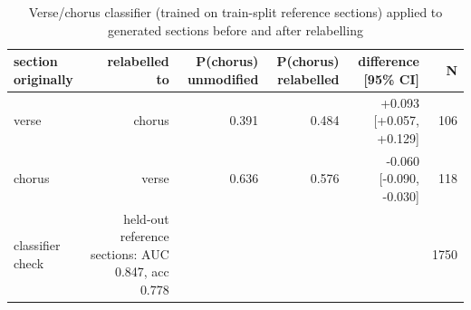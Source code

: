 \begin{table}[t]
\centering
\small
\begin{tabular}{lrrrrr}
\toprule
section originally & relabelled to & P(chorus) unmodified & P(chorus) relabelled & difference [95\% CI] & N \\
\midrule
verse & chorus & 0.391 & 0.484 & +0.093 [+0.057, +0.129] & 106 \\
chorus & verse & 0.636 & 0.576 & -0.060 [-0.090, -0.030] & 118 \\
classifier check & held-out reference sections: AUC 0.847, acc 0.778 &  &  &  & 1750 \\
\bottomrule
\end{tabular}
\caption{Verse/chorus classifier (trained on train-split reference sections) applied to generated sections before and after relabelling}
\label{tab:section_semantics_classifier}
\end{table}
